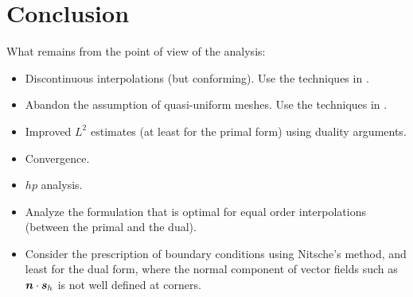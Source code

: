 
\section{Conclusion}

What remains from the point of view of the analysis:
\begin{itemize}
\item Discontinuous interpolations (but conforming). Use the techniques in \cite{Codina2009}.
\item Abandon the assumption of quasi-uniform meshes. Use the techniques in \cite{codina2008}.
\item Improved $L^2$ estimates (at least for the primal form) using duality arguments.
\item Convergence.
\item $hp$ analysis.
\item Analyze the formulation that is optimal for equal order interpolations (between the primal and the dual).
\item Consider the prescription of boundary conditions using Nitsche's method, and least for the dual form, where the normal component of vector fields such as $\bm{n}\cdot\bm{s}_h$ is not well defined at corners.
\end{itemize}